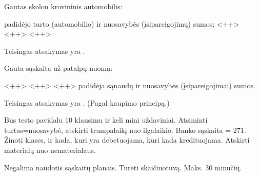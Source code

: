 \begin{tasks}
  \begin{task}
    \begin{condition}
      Gautas skolon krovininis automobilis:
      \begin{enumerate}
         padidėjo turto (automobilio) ir nuosavybės
          (įsipareigojimų) sumos;
         <++>
         <++>
         <++>
      \end{enumerate}
    \end{condition}
    \begin{solution}
      Teisingas atsakymas yra .
    \end{solution}
  \end{task}

  \begin{task}
    \begin{condition}
      Gauta sąskaita už patalpų nuomą:
      \begin{enumerate}
         <++>
         <++>
         <++>
         padidėja sąnaudų ir nuosavybės (įsipareigojimai)
          sumos.
      \end{enumerate}
    \end{condition}
    \begin{solution}
      Teisingas atsakymas yra . (Pagal kaupimo principą.)
    \end{solution}
  \end{task}

\end{tasks}

Bus testo pavidalu 10 klausimu ir keli mini uždaviniai.
Atsiminti turtas=nuosavybė, atskirti trumpalaikį nuo ilgalaikio.
Banko sąskaita = 271.
Žinoti klases, ir kada, kuri yra debetuojama, kuri kada kredituojama.
Atskirti materialų nuo nematerialaus.

Negalima naudotis sąskaitų planais.
Turėti skaičiuotuvą.
Maks. 30 minučių.
